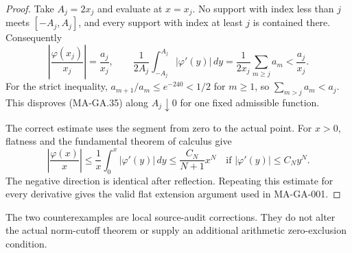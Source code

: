 \begin{proof}
Take $A_j=2x_j$ and evaluate at $x=x_j$.
No support with index less than $j$ meets $[-A_j,A_j]$,
and every support with index at least $j$ is contained
there.  Consequently
\[
 \left|\frac{\varphi(x_j)}{x_j}\right|=\frac{a_j}{x_j},
 \qquad
 \frac1{2A_j}\int_{-A_j}^{A_j}|\varphi'(y)|\,dy
          =\frac1{2x_j}\sum_{m\geq j}a_m
          <\frac{a_j}{x_j}.
 \tag{MA-GA.37}
\]
For the strict inequality, $a_{m+1}/a_m\leq e^{-240}<1/2$
for $m\geq1$, so $\sum_{m>j}a_m<a_j$.
This disproves (MA-GA.35) along $A_j\downarrow0$ for
one fixed admissible function.

The correct estimate uses the segment from zero to the
actual point.  For $x>0$, flatness and the fundamental
theorem of calculus give
\[
 \left|\frac{\varphi(x)}x\right|
       \leq\frac1x\int_0^x|\varphi'(y)|\,dy
       \leq\frac{C_N}{N+1}x^N
       \quad\text{if }|\varphi'(y)|\leq C_Ny^N.
 \tag{MA-GA.38}
\]
The negative direction is identical after reflection.
Repeating this estimate for every derivative gives the
valid flat extension argument used in MA-GA-001.
\end{proof}

The two counterexamples are local source-audit corrections.
They do not alter the actual norm-cutoff theorem or supply
an additional arithmetic zero-exclusion condition.
